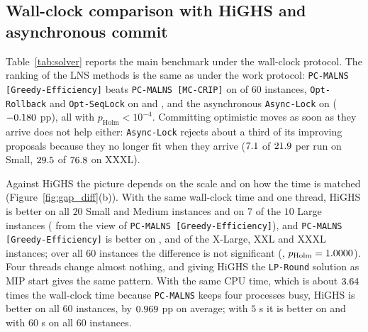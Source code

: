 \documentclass[a4paper,fleqn]{cas-sc}
\newcommand{\pcm}{\texttt{PC-MALNS}}
\newcommand{\pge}{\texttt{PC-MALNS [Greedy-Efficiency]}}
\newcommand{\pmc}{\texttt{PC-MALNS [MC-CRIP]}}
\begin{document}


\subsection{Wall-clock comparison with HiGHS and asynchronous commit}
\label{sec:solver}
Table~\ref{tab:solver} reports the main benchmark under the wall-clock protocol. The ranking of the LNS methods is the same as under the work protocol: \pge{} beats \pmc{} on \SolverWinsMC{} of $60$ instances, \texttt{Opt-Rollback} and \texttt{Opt-SeqLock} on \SolverWinsOR{} and \SolverWinsOS, and the asynchronous \texttt{Async-Lock} on \SolverWinsAL{} ($-0.180$ pp), all with $p_{\text{Holm}} < 10^{-4}$. Committing optimistic moves as soon as they arrive does not help either: \texttt{Async-Lock} rejects about a third of its improving proposals because they no longer fit when they arrive ($7.1$ of $21.9$ per run on Small, $29.5$ of $76.8$ on XXXL).

Against HiGHS the picture depends on the scale and on how the time is matched (Figure~\ref{fig:gap_diff}(b)). With the same wall-clock time and one thread, HiGHS is better on all $20$ Small and Medium instances and on $7$ of the $10$ Large instances (\SolverScaleLaWTLHW{} from the view of \pge), and \pge{} is better on \SolverScaleXLWinsHW{}, \SolverScaleXXLWinsHW{} and \SolverScaleXXXLWinsHW{} of the X-Large, XXL and XXXL instances; over all $60$ instances the difference is not significant (\SolverWTLHW, $p_{\text{Holm}} = 1.0000$). Four threads change almost nothing, and giving HiGHS the \texttt{LP-Round} solution as MIP start gives the same pattern. With the same CPU time, which is about $3.64$ times the wall-clock time because \pcm{} keeps four processes busy, HiGHS is better on all $60$ instances, by $0.969$ pp on average; with $5$ s it is better on \SolverLossesHFive{} and with $60$ s on all $60$ instances.


\end{document}
